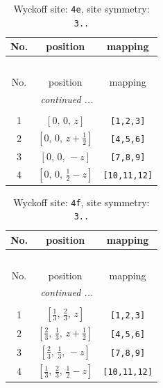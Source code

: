 \documentclass[fleqn,8pt]{jsarticle}
\begin{document}
\begin{longtable}{ccc}
\caption{Wyckoff site: {\tt 4e}, site symmetry: {\tt 3..}}
 \\
 \hline \hline
No. & position & mapping \\ \hline \endfirsthead

\multicolumn{2}{l}{\tablename\ \thetable{}} \\
 \hline \hline
No. & position & mapping \\ \hline \endhead

 \hline \hline
\multicolumn{2}{r}{\footnotesize\it continued ...} \\ \endfoot

 \hline \hline
\multicolumn{2}{r}{} \\ \endlastfoot

1 & $\left[ 0,\, 0,\, z \right]$ & {\tt [1,2,3]} \\ \hline
2 & $\left[ 0,\, 0,\, z + \frac{1}{2} \right]$ & {\tt [4,5,6]} \\ \hline
3 & $\left[ 0,\, 0,\, - z \right]$ & {\tt [7,8,9]} \\ \hline
4 & $\left[ 0,\, 0,\, \frac{1}{2} - z \right]$ & {\tt [10,11,12]} \\
\end{longtable}
\renewcommand{\arraystretch}{1.2}
\begin{longtable}{ccc}
\caption{Wyckoff site: {\tt 4f}, site symmetry: {\tt 3..}}
 \\
 \hline \hline
No. & position & mapping \\ \hline \endfirsthead

\multicolumn{2}{l}{\tablename\ \thetable{}} \\
 \hline \hline
No. & position & mapping \\ \hline \endhead

 \hline \hline
\multicolumn{2}{r}{\footnotesize\it continued ...} \\ \endfoot

 \hline \hline
\multicolumn{2}{r}{} \\ \endlastfoot

1 & $\left[ \frac{1}{3},\, \frac{2}{3},\, z \right]$ & {\tt [1,2,3]} \\ \hline
2 & $\left[ \frac{2}{3},\, \frac{1}{3},\, z + \frac{1}{2} \right]$ & {\tt [4,5,6]} \\ \hline
3 & $\left[ \frac{2}{3},\, \frac{1}{3},\, - z \right]$ & {\tt [7,8,9]} \\ \hline
4 & $\left[ \frac{1}{3},\, \frac{2}{3},\, \frac{1}{2} - z \right]$ & {\tt [10,11,12]} \\
\end{longtable}
\end{document}
